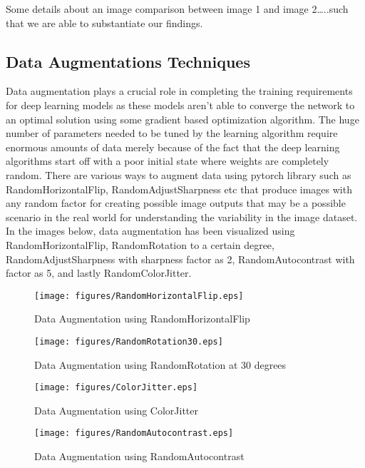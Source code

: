 \documentclass[conference]{IEEEtran}
\begin{document}
Some details about an image comparison between image 1 and image 2…..such that we are able to substantiate our findings.

\subsection{Data Augmentations Techniques}
Data augmentation plays a crucial role in completing the training requirements for deep learning models as these models aren’t able to converge the network to an optimal solution using some gradient based optimization algorithm. The huge number of parameters needed to be tuned by the learning algorithm require enormous amounts of data merely because of the fact that the deep learning algorithms start off with a poor initial state where weights are completely random. There are various ways to augment data using pytorch library such as RandomHorizontalFlip, RandomAdjustSharpness etc that produce images with any random factor for creating possible image outputs that may be a possible scenario in the real world for understanding the variability in the image dataset. 
In the images below, data augmentation has been visualized using RandomHorizontalFlip, RandomRotation to a certain degree, RandomAdjustSharpness with sharpness factor as 2,  RandomAutocontrast with factor as 5, and lastly RandomColorJitter.

\begin{figure}[htbp] 
    \texttt{[image: figures/RandomHorizontalFlip.eps]} 
    \caption{Data Augmentation using RandomHorizontalFlip} 
    \label{fig} 
    \end{figure}

\begin{figure}[htbp] 
    \texttt{[image: figures/RandomRotation30.eps]} 
    \caption{Data Augmentation using RandomRotation at 30 degrees} 
    \label{fig} 
    \end{figure}

\begin{figure}[htbp] 
    \texttt{[image: figures/ColorJitter.eps]} 
    \caption{Data Augmentation using ColorJitter} 
    \label{fig} 
    \end{figure}

\begin{figure}[htbp] 
    \texttt{[image: figures/RandomAutocontrast.eps]} 
    \caption{Data Augmentation using RandomAutocontrast} 
    \label{fig} 
    \end{figure}
\end{document}
